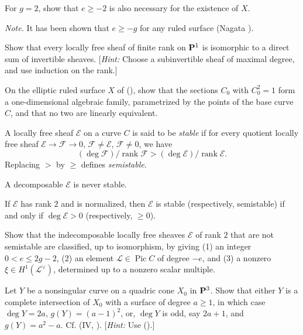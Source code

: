 {{\begin{description}[style=multiline,labelwidth=1.8em,leftmargin=2.15em,itemsep=3pt,topsep=0pt,parsep=0pt]
\begin{parts}
\item For $g=2$, show that $e\ge-2$ is also necessary for the existence of $X$.
\end{parts}
\emph{Note.} It has been shown that $e\ge-g$ for any ruled surface (Nagata ).
\item[\hypertarget{ex-V-2.6}{}2.6.] Show that every locally free sheaf of finite rank on $\mathbf{P}^1$ is isomorphic to a direct sum of invertible sheaves. [\emph{Hint:} Choose a subinvertible sheaf of maximal degree, and use induction on the rank.]
\item[\hypertarget{ex-V-2.7}{}2.7.] On the elliptic ruled surface $X$ of (), show that the sections $C_0$ with $C_0^2=1$ form a one-dimensional algebraic family, parametrized by the points of the base curve $C$, and that no two are linearly equivalent.
\item[\hypertarget{ex-V-2.8}{}2.8.] A locally free sheaf $\mathcal E$ on a curve $C$ is said to be \emph{stable} if for every quotient locally free sheaf $\mathcal E\to\mathcal F\to0$, $\mathcal F\ne\mathcal E$, $\mathcal F\ne0$, we have
\[
(\deg\mathcal F)/\operatorname{rank}\mathcal F>(\deg\mathcal E)/\operatorname{rank}\mathcal E.
\]
Replacing $>$ by $\ge$ defines \emph{semistable}.
\begin{parts}
\item A decomposable $\mathcal E$ is never stable.
\item If $\mathcal E$ has rank $2$ and is normalized, then $\mathcal E$ is stable (respectively, semistable) if and only if $\deg\mathcal E>0$ (respectively, $\ge0$).
\item Show that the indecomposable locally free sheaves $\mathcal E$ of rank $2$ that are not semistable are classified, up to isomorphism, by giving (1) an integer $0<e\le2g-2$, (2) an element $\mathcal L\in\operatorname{Pic}C$ of degree $-e$, and (3) a nonzero $\xi\in H^1(\mathcal L^\vee)$, determined up to a nonzero scalar multiple.
\end{parts}
\item[\hypertarget{ex-V-2.9}{}2.9.] Let $Y$ be a nonsingular curve on a quadric cone $X_0$ in $\mathbf{P}^3$. Show that either $Y$ is a complete intersection of $X_0$ with a surface of degree $a\ge1$, in which case $\deg Y=2a$, $g(Y)=(a-1)^2$, or, $\deg Y$ is odd, say $2a+1$, and $g(Y)=a^2-a$. Cf. (IV, ). [\emph{Hint:} Use ().]
\end{description}
}
}

